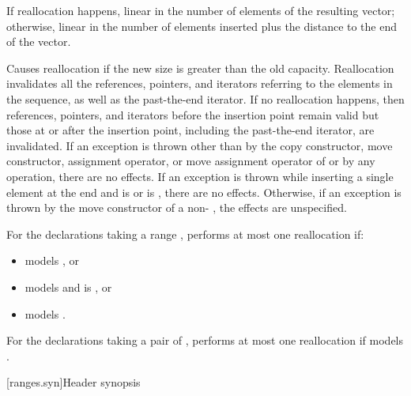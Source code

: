\documentclass{wg21}
\begin{document}
\begin{itemdescr}
    \pnum
    \complexity
    If reallocation happens,
    linear in the number of elements of the resulting vector;
    otherwise,
    linear in the number of elements inserted plus the distance
    to the end of the vector.

    \pnum
    \remarks
    Causes reallocation if the new size is greater than the old capacity.
    Reallocation invalidates all the references, pointers, and iterators
    referring to the elements in the sequence, as well as the past-the-end iterator.
    If no reallocation happens, then
    references, pointers, and iterators
    before the insertion point remain valid
    but those at or after the insertion point,
    including the past-the-end iterator,
    are invalidated.
    If an exception is thrown other than by
    the copy constructor, move constructor,
    assignment operator, or move assignment operator of
     or by any  operation,
    there are no effects.
    If an exception is thrown while inserting a single element at the end and
     is  or 
    is , there are no effects.
    Otherwise, if an exception is thrown by the move constructor of a non-
    , the effects are unspecified.

    \begin{addedblock}
    For the declarations taking a range , performs at most one reallocation if:
    \begin{itemize}
        \item {} models , or
        \item {} models  and  is , or
        \item {} models .
    \end{itemize}
     For the declarations taking a pair of , performs at most one reallocation if  models .
    \end{addedblock}

\end{itemdescr}

[ranges.syn]{Header  synopsis}
\end{document}
